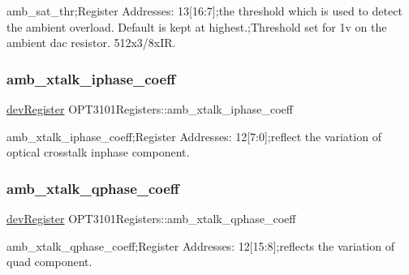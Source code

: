 amb\+\_\+sat\+\_\+thr;Register Addresses\+: 13\mbox{[}16\+:7\mbox{]};the threshold which is used to detect the ambient overload. Default is kept at highest.;Threshold set for 1v on the ambient dac resistor. 512x3/8x\+IR. 

\mbox{\label{class_o_p_t3101_registers_a662ff3f116c2aa3dde421a44c09b18a5}} 
\subsubsection{\texorpdfstring{amb\+\_\+xtalk\+\_\+iphase\+\_\+coeff}{amb\_xtalk\_iphase\_coeff}}
{\footnotesize\ttfamily \mbox{\hyperlink{classdev_register}{dev\+Register}} O\+P\+T3101\+Registers\+::amb\+\_\+xtalk\+\_\+iphase\+\_\+coeff}



amb\+\_\+xtalk\+\_\+iphase\+\_\+coeff;Register Addresses\+: 12\mbox{[}7\+:0\mbox{]};reflect the variation of optical crosstalk inphase component. 

\mbox{\label{class_o_p_t3101_registers_afc46bb579b68a9502857fc4befe600db}} 
\subsubsection{\texorpdfstring{amb\+\_\+xtalk\+\_\+qphase\+\_\+coeff}{amb\_xtalk\_qphase\_coeff}}
{\footnotesize\ttfamily \mbox{\hyperlink{classdev_register}{dev\+Register}} O\+P\+T3101\+Registers\+::amb\+\_\+xtalk\+\_\+qphase\+\_\+coeff}



amb\+\_\+xtalk\+\_\+qphase\+\_\+coeff;Register Addresses\+: 12\mbox{[}15\+:8\mbox{]};reflects the variation of quad component. 

\mbox{\label{class_o_p_t3101_registers_a501629ec4152d76e3c5fadc997a22e2d}} 
